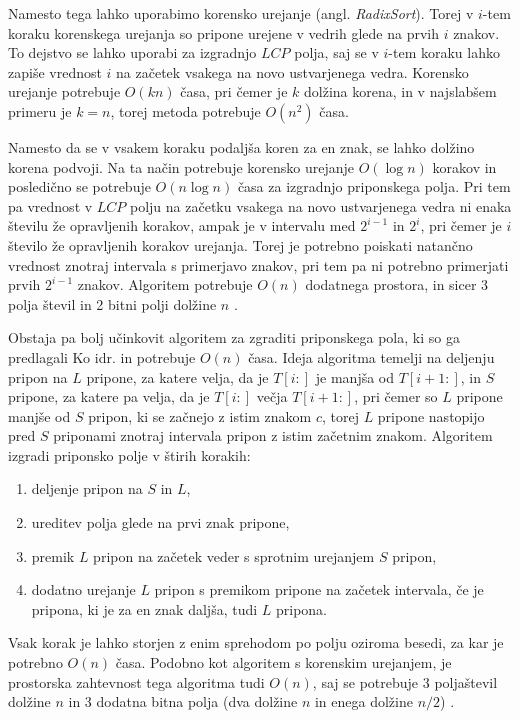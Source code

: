 Namesto tega lahko uporabimo korensko urejanje (angl. \textit{RadixSort}). Torej v $i$-tem koraku korenskega urejanja so pripone urejene v vedrih glede na prvih $i$ znakov. To dejstvo se lahko uporabi za izgradnjo $LCP$ polja, saj se v $i$-tem koraku lahko zapiše vrednost $i$ na začetek vsakega na novo ustvarjenega vedra. Korensko urejanje potrebuje $O(kn)$ časa, pri čemer je $k$ dolžina korena, in v najslabšem primeru je $k=n$, torej metoda potrebuje $O(n^2)$ časa.

Namesto da se v vsakem koraku podaljša koren za en znak, se lahko dolžino korena podvoji. Na ta način potrebuje korensko urejanje $O(\log{n})$ korakov in posledično se potrebuje $O(n\log{n})$ časa za izgradnjo priponskega polja. Pri tem pa vrednost v $LCP$ polju na začetku vsakega na novo ustvarjenega vedra ni enaka številu že opravljenih korakov, ampak je v intervalu med $2^{i-1}$ in $2^{i}$, pri čemer je $i$ število že opravljenih korakov urejanja. Torej je potrebno poiskati natančno vrednost znotraj intervala s primerjavo znakov, pri tem pa ni potrebno primerjati prvih $2^{i-1}$ znakov. Algoritem potrebuje $O(n)$ dodatnega prostora, in sicer 3 polja števil in 2 bitni polji dolžine $n$ \cite{Manber1990}.


Obstaja pa bolj učinkovit algoritem za zgraditi priponskega pola, ki so ga predlagali Ko idr. \cite{Ko2005} in potrebuje $O(n)$ časa. Ideja algoritma temelji na deljenju pripon na $L$ pripone, za katere velja, da je  $T[i:]$ je manjša od $T[i+1:]$, in $S$ pripone, za katere pa velja, da je $T[i:]$ večja $T[i+1:]$, pri čemer so $L$ pripone manjše od $S$ pripon, ki se začnejo z istim znakom $c$, torej $L$ pripone nastopijo pred $S$ priponami znotraj intervala pripon z istim začetnim znakom. Algoritem izgradi priponsko polje v štirih korakih:
\begin{enumerate}
    \item deljenje pripon na $S$ in $L$,
    \item ureditev polja glede na prvi znak pripone,
    \item premik $L$ pripon na začetek veder s sprotnim urejanjem $S$ pripon,
    \item dodatno urejanje $L$ pripon s premikom pripone na začetek intervala, če je pripona, ki je za en znak daljša, tudi $L$ pripona.
\end{enumerate}
Vsak korak je lahko storjen z enim sprehodom po polju oziroma besedi, za kar je potrebno $O(n)$ časa. Podobno kot algoritem s korenskim urejanjem, je prostorska zahtevnost tega algoritma tudi $O(n)$, saj se potrebuje 3 poljaštevil dolžine $n$ in 3 dodatna bitna polja (dva dolžine $n$ in enega dolžine $n/2$) \cite{Ko2005}.